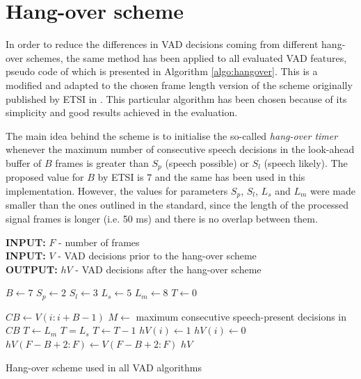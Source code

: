 
\section{Hang-over scheme}
\label{sec:hang}

In order to reduce the differences in VAD decisions coming from different hang-over schemes, the same method has been applied to all evaluated VAD features, pseudo code of which is presented in Algorithm \ref{algo:hangover}. This is a modified and adapted to the chosen frame length version of the scheme originally published by ETSI in \cite{ETSIHangover}. This particular algorithm has been chosen because of its simplicity and good results achieved in the evaluation.

The main idea behind the scheme is to initialise the so-called \emph{hang-over timer} whenever the maximum number of consecutive speech decisions in the look-ahead buffer of $B$ frames is greater than $S_p$ (speech possible) or $S_l$ (speech likely). The proposed value for $B$ by ETSI is $7$ and the same has been used in this implementation. However, the values for parameters $S_p$, $S_l$, $L_s$ and $L_m$ were made smaller than the ones outlined in the standard, since the length of the processed signal frames is longer (i.e. 50 ms) and there is no overlap between them.

\begin{algorithm}
\textbf{INPUT:} $F$ - number of frames \\
\textbf{INPUT:} $V$ - VAD decisions prior to the hang-over scheme \\
\textbf{OUTPUT:} $hV$ - VAD decisions after the hang-over scheme
\begin{algorithmic}[1]
\STATE $B \leftarrow 7$ 
\STATE $S_p \leftarrow 2$  
\STATE $S_l \leftarrow 3$ 
\STATE $L_s \leftarrow 5$ 
\STATE $L_m \leftarrow 8$ 
\STATE
\STATE $T \leftarrow 0$ 

\STATE $CB \leftarrow V(i:i+B-1)$ 
\STATE $M \leftarrow$ maximum consecutive speech-present decisions in $CB$
\STATE $T \leftarrow L_m$
\STATE $T = L_s$
\STATE $T \leftarrow T-1$
\ENDIF
{}
\STATE $hV(i) \leftarrow 1$
\ELSE
\STATE $hV(i) \leftarrow 0$
\ENDIF
\ENDFOR
\STATE $hV(F-B+2:F) \leftarrow V(F-B+2:F)$ 
\RETURN $hV$
\end{algorithmic}
\caption{Hang-over scheme used in all VAD algorithms}
\label{algo:hangover}
\end{algorithm}

